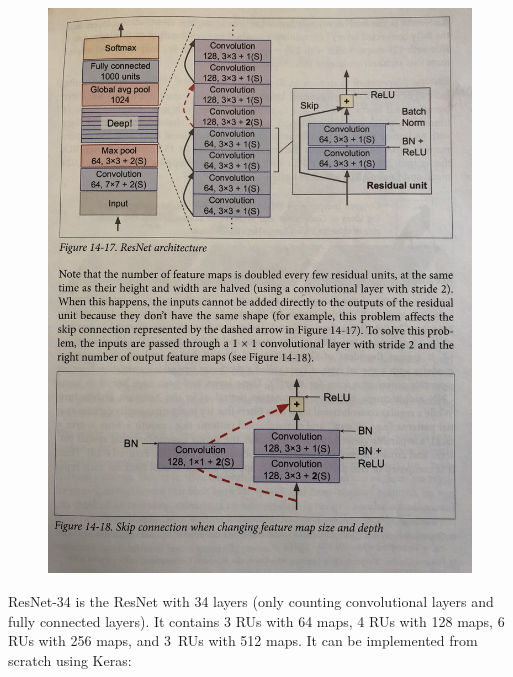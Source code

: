 \begin{figure}[ht]
\centering
\includegraphics[width=1.0\textwidth, angle=270]{./images/resnet.jpg}
\end{figure}

\newpage
ResNet-34 is the ResNet with 34 layers (only counting convolutional layers and fully connected layers).
It contains 3 RUs with 64 maps, 4 RUs with 128 maps, 6 RUs with 256 maps, and 3~RUs with 512 maps.
It can be implemented from scratch using Keras:

